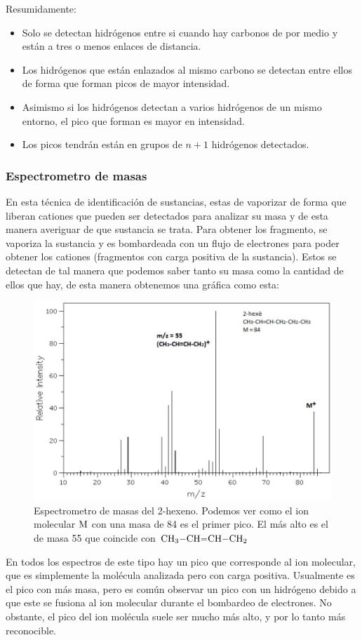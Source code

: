 \documentclass[arial,a4paper,print]{article}
\begin{document}
Resumidamente:
\begin{itemize}
\item Solo se detectan hidrógenos entre si cuando hay carbonos de por medio y están a tres o menos enlaces de distancia. 

\item Los hidrógenos que están enlazados al mismo carbono se detectan entre ellos de forma que forman picos de mayor intensidad. 

\item Asimismo si los hidrógenos detectan a varios hidrógenos de un mismo entorno, el pico que forman es mayor en intensidad. 

\item Los picos tendrán están en grupos de $n+1$ hidrógenos detectados. 

\end{itemize}

\subsubsection{Espectrometro de masas}	
En esta técnica de identificación de sustancias, estas de vaporizar de forma que liberan cationes que pueden ser detectados para analizar su masa y de esta manera averiguar de que sustancia se trata. Para obtener los fragmento, se vaporiza la sustancia y es bombardeada con un flujo de electrones para poder obtener los cationes (fragmentos con carga positiva de la sustancia). Estos se detectan de tal manera que podemos saber tanto su masa como la cantidad de ellos que hay, de esta manera obtenemos una gráfica como esta:
\begin{figure}[H]
	\centering
	\includegraphics[width=0.5\linewidth]{figures/espec_masa}
	\caption{Espectrometro de masas del 2-hexeno. Podemos ver como el ion molecular $\ce{M^}$ con una masa de 84 es el primer pico. El más alto es el de masa 55 que coincide con $\ce{CH_3-CH=CH-CH_2}$}
	\label{fig:especmasa}
\end{figure}

\pagebreak
En todos los espectros de este tipo hay un pico que corresponde al ion molecular, que es simplemente la molécula analizada pero con carga positiva. Usualmente es el pico con más masa, pero es común observar un pico con un hidrógeno debido a que este se fusiona al ion molecular durante el bombardeo de electrones. No obstante, el pico del ion molécula suele ser mucho más alto, y por lo tanto más reconocible. 
\end{document}
